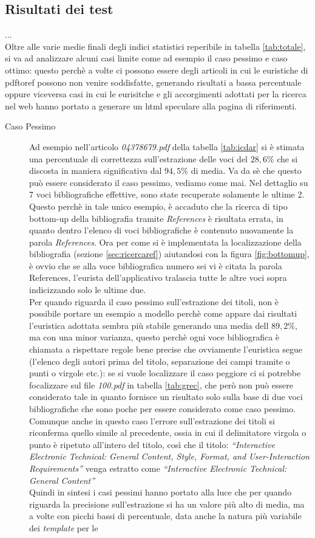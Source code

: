 \subsection{Risultati dei test}
...\\
Oltre alle varie medie finali degli indici statistici reperibile in tabella \ref{tab:totale}, si va ad analizzare alcuni casi limite come ad esempio il caso pessimo e caso ottimo: questo perchè a volte ci possono essere degli articoli in cui le euristiche di pdftoref possono non venire soddisfatte, generando risultati a bassa percentuale oppure viceversa casi in cui le eurisitche e gli accorgimenti adottati per la ricerca nel web hanno portato a generare un html speculare alla pagina di riferimenti.
\begin{description}
	\item[Caso Pessimo]Ad esempio nell'articolo \textit{04378679.pdf} della tabella \ref{tab:icdar} si è stimata una percentuale di correttezza sull'estrazione delle voci del $28,6\%$ che si discosta in maniera significativa dal $94,5\%$ di media. Va da sè che questo può essere considerato il caso pessimo, vediamo come mai. Nel dettaglio su 7 voci bibliografiche effettive, sono state recuperate solamente le ultime 2. Questo perchè in tale unico esempio, è accaduto che la ricerca di tipo bottom-up della bibliografia tramite \textit{References} è risultata errata, in quanto dentro l'elenco di voci bibliografiche è contenuto nuovamente la parola \textit{References}. Ora per come si è implementata la localizzazione della bibliografia (sezione \ref{sec:ricercaref}) aiutandosi con la figura \ref{fig:bottomup}, è ovvio che se alla voce bibliografica numero sei vi è citata la parola References, l'eurista dell'applicativo tralascia tutte le altre voci sopra indicizzando solo le ultime due.\\ Per quando riguarda il caso pessimo sull'estrazione dei titoli, non è possibile portare un esempio a modello perchè come appare dai risultati l'euristica adottata sembra più stabile generando una media dell $89,2\%$, ma con una minor varianza, questo perchè ogni voce bibliografica è chiamata a rispettare regole bene precise che ovviamente l'euristica segue (l'elenco degli autori prima del titolo, separazione dei campi tramite o punti o virgole etc.): se si vuole localizzare il caso peggiore ci si potrebbe focalizzare sul file \textit{100.pdf} in tabella \ref{tab:grec}, che però non può essere considerato tale in quanto fornisce un risultato solo sulla base di due voci bibliografiche che sono poche per essere considerato come caso pessimo. Comunque anche in questo caso l'errore sull'estrazione dei titoli si riconferma quello simile al precedente, ossia in cui il delimitatore virgola o punto è ripetuto all'intero del titolo, così che il titolo: \textit{``Interactive Electronic Technical: General Content, Style, Format, and User-Interaction Requirements''} venga estratto come \textit{``Interactive Electronic Technical: General Content''}\\ Quindi in sintesi i casi pessimi hanno portato alla luce che per quando riguarda la precisione sull'estrazione si ha un valore più alto di media, ma a volte con picchi bassi di percentuale, data anche la natura più variabile dei \textit{template} per le 
\end{description}
